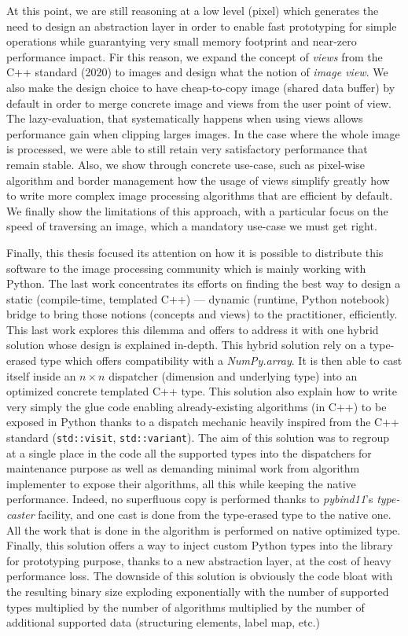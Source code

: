 At this point, we are still reasoning at a low level (pixel) which generates the need to design an abstraction layer in
order to enable fast prototyping for simple operations while guarantying very small memory footprint and near-zero
performance impact. Fir this reason, we expand the concept of \emph{views} from the C++ standard (2020) to images and
design what the notion of \emph{image view}. We also make the design choice to have cheap-to-copy image (shared data
buffer) by default in order to merge concrete image and views from the user point of view. The lazy-evaluation, that
systematically happens when using views allows performance gain when clipping larges images. In the case where the whole
image is processed, we were able to still retain very satisfactory performance that remain stable. Also, we show through
concrete use-case, such as pixel-wise algorithm and border management how the usage of views simplify greatly how to
write more complex image processing algorithms that are efficient by default. We finally show the limitations of this
approach, with a particular focus on the speed of traversing an image, which a mandatory use-case we must get right.

Finally, this thesis focused its attention on how it is possible to distribute this software to the image processing
community which is mainly working with Python. The last work concentrates its efforts on finding the best way to design
a static (compile-time, templated C++) --- dynamic (runtime, Python notebook) bridge to bring those notions (concepts
and views) to the practitioner, efficiently. This last work explores this dilemma and offers to address it with one
hybrid solution whose design is explained in-depth. This hybrid solution rely on a type-erased type which offers
compatibility with a \emph{NumPy.array}. It is then able to cast itself inside an \(n \times n\) dispatcher (dimension
and underlying type) into an optimized concrete templated C++ type. This solution also explain how to write very simply
the glue code enabling already-existing algorithms (in C++) to be exposed in Python thanks to a dispatch mechanic
heavily inspired from the C++ standard (\texttt{std::visit}, \texttt{std::variant}). The aim of this solution was to
regroup at a single place in the code all the supported types into the dispatchers for maintenance purpose as well as
demanding minimal work from algorithm implementer to expose their algorithms, all this while keeping the native
performance. Indeed, no superfluous copy is performed thanks to \emph{pybind11}'s \emph{type-caster} facility, and one
cast is done from the type-erased type to the native one. All the work that is done in the algorithm is performed on
native optimized type. Finally, this solution offers a way to inject custom Python types into the library for
prototyping purpose, thanks to a new abstraction layer, at the cost of heavy performance loss. The downside of this
solution is obviously the code bloat with the resulting binary size exploding exponentially with the number of supported
types multiplied by the number of algorithms multiplied by the number of additional supported data (structuring
elements, label map, etc.)

